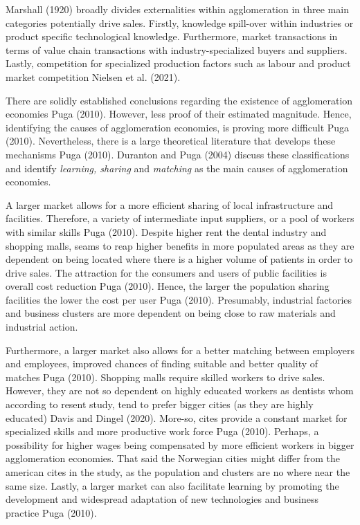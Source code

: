 \documentclass[
  10,
  a4paper,
]{article}
\begin{document}
Marshall (1920) broadly divides externalities within agglomeration in
three main categories potentially drive sales. Firstly, knowledge
spill-over within industries or product specific technological
knowledge. Furthermore, market transactions in terms of value chain
transactions with industry-specialized buyers and suppliers. Lastly,
competition for specialized production factors such as labour and
product market competition Nielsen et al. (2021).

There are solidly established conclusions regarding the existence of
agglomeration economies Puga (2010). However, less proof of their
estimated magnitude. Hence, identifying the causes of agglomeration
economies, is proving more difficult Puga (2010). Nevertheless, there is
a large theoretical literature that develops these mechanisms Puga
(2010). Duranton and Puga (2004) discuss these classifications and
identify \emph{learning, sharing} and \emph{matching} as the main causes
of agglomeration economies.

A larger market allows for a more efficient sharing of local
infrastructure and facilities. Therefore, a variety of intermediate
input suppliers, or a pool of workers with similar skills Puga (2010).
Despite higher rent the dental industry and shopping malls, seams to
reap higher benefits in more populated areas as they are dependent on
being located where there is a higher volume of patients in order to
drive sales. The attraction for the consumers and users of public
facilities is overall cost reduction Puga (2010). Hence, the larger the
population sharing facilities the lower the cost per user Puga (2010).
Presumably, industrial factories and business clusters are more
dependent on being close to raw materials and industrial action.

Furthermore, a larger market also allows for a better matching between
employers and employees, improved chances of finding suitable and better
quality of matches Puga (2010). Shopping malls require skilled workers
to drive sales. However, they are not so dependent on highly educated
workers as dentists whom according to resent study, tend to prefer
bigger cities (as they are highly educated) Davis and Dingel (2020).
More-so, cites provide a constant market for specialized skills and more
productive work force Puga (2010). Perhaps, a possibility for higher
wages being compensated by more efficient workers in bigger
agglomeration economies. That said the Norwegian cities might differ
from the american cites in the study, as the population and clusters are
no where near the same size. Lastly, a larger market can also facilitate
learning by promoting the development and widespread adaptation of new
technologies and business practice Puga (2010).
\end{document}
